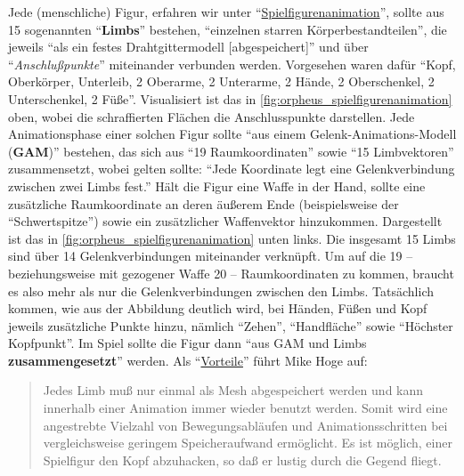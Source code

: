 \documentclass[a5paper,pagesize]{scrbook}
\begin{document}
Jede (menschliche) Figur, erfahren wir unter \enquote{\uline{Spielfigurenanimation}}, sollte aus 15 sogenannten \enquote{\textbf{Limbs}} bestehen, \enquote{einzelnen starren Körperbestandteilen}, die  jeweils \enquote{als ein festes Drahtgittermodell [abgespeichert]} und über \enquote{\textit{Anschlußpunkte}} miteinander verbunden werden.
Vorgesehen waren dafür \enquote{Kopf, Oberkörper, Unterleib, 2 Oberarme, 2 Unterarme, 2 Hände, 2 Oberschenkel, 2 Unterschenkel, 2 Füße}.
Visualisiert ist das in \autoref{fig:orpheus_spielfigurenanimation} oben, wobei die schraffierten Flächen die Anschlusspunkte darstellen.
Jede Animationsphase einer solchen Figur sollte \enquote{aus einem Gelenk-Animations-Modell (\textbf{GAM})} bestehen, das sich aus \enquote{19 Raumkoordinaten} sowie \enquote{15 Limbvektoren} zusammensetzt, wobei gelten sollte: \enquote{Jede Koordinate legt eine Gelenkverbindung zwischen zwei Limbs fest.}
Hält die Figur eine Waffe in der Hand, sollte eine zusätzliche Raumkoordinate an deren äußerem Ende (beispielsweise der \enquote{Schwertspitze}) sowie ein zusätzlicher Waffenvektor hinzukommen.\autocite[S.~1]{orpheus_zusammenfassung}
Dargestellt ist das in \autoref{fig:orpheus_spielfigurenanimation} unten links.
Die insgesamt 15 Limbs sind über 14 Gelenkverbindungen miteinander verknüpft.
Um auf die 19 -- beziehungsweise mit gezogener Waffe 20 -- Raumkoordinaten zu kommen, braucht es also mehr als nur die Gelenkverbindungen zwischen den Limbs.
Tatsächlich kommen, wie aus der Abbildung deutlich wird, bei Händen, Füßen und Kopf jeweils zusätzliche Punkte hinzu, nämlich \enquote{Zehen}, \enquote{Handfläche} sowie \enquote{Höchster Kopfpunkt}.\autocite[S.~3]{orpheus_zusammenfassung}
Im Spiel sollte die Figur dann \enquote{aus GAM und Limbs \textbf{zusammengesetzt}} werden.\autocite[S.~1]{orpheus_zusammenfassung}
Als \enquote{\uline{Vorteile}} führt Mike Hoge auf:

\begin{quote}
   Jedes Limb muß nur einmal als Mesh abgespeichert werden und kann innerhalb einer Animation immer wieder benutzt werden.
   Somit wird eine angestrebte Vielzahl von Bewegungsabläufen und Animationsschritten bei vergleichsweise geringem Speicheraufwand ermöglicht.
   Es ist möglich, einer Spielfigur den Kopf abzuhacken, so daß er lustig durch die Gegend fliegt.\autocite[S.~1]{orpheus_zusammenfassung}
\end{quote}
\end{document}
